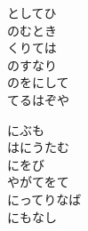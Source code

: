 \documentclass[10pt,b5j]{tarticle} %
\begin{document}
\begin{enumerate}
\begin{minipage}[c]{\blocksize}
        \vspace{\linespace}
        \item
        としてひ\\
        のむとき\\
        くりては\\
        のすなり\\
        のをにして\\
        てるはぞや
        
        \vspace{\linespace}
        \item
        にぶも\\
        はにうたむ\\
        にをび\\
        やがてをて\\
        にってりなば\\
        にもなし
    
    \end{minipage}
\end{enumerate} %
\end{document}
